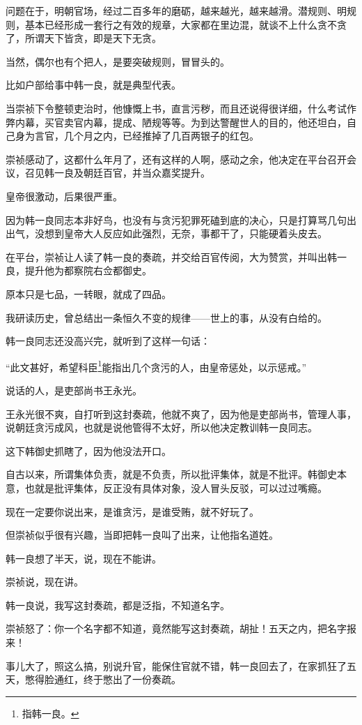 \begin{multicols}{\theparacolNo}
问题在于，明朝官场，经过二百多年的磨砺，越来越光，越来越滑。潜规则、明规则，基本已经形成一套行之有效的规章，大家都在里边混，就谈不上什么贪不贪了，所谓天下皆贪，即是天下无贪。

当然，偶尔也有个把人，是要突破规则，冒冒头的。

比如户部给事中韩一良，就是典型代表。

当崇祯下令整顿吏治时，他慷慨上书，直言污秽，而且还说得很详细，什么考试作弊内幕，买官卖官内幕，提成、陋规等等。为到达警醒世人的目的，他还坦白，自己身为言官，几个月之内，已经推掉了几百两银子的红包。

崇祯感动了，这都什么年月了，还有这样的人啊，感动之余，他决定在平台召开会议，召见韩一良及朝廷百官，并当众嘉奖提升。

皇帝很激动，后果很严重。

因为韩一良同志本非好鸟，也没有与贪污犯罪死磕到底的决心，只是打算骂几句出出气，没想到皇帝大人反应如此强烈，无奈，事都干了，只能硬着头皮去。

在平台，崇祯让人读了韩一良的奏疏，并交给百官传阅，大为赞赏，并叫出韩一良，提升他为都察院右佥都御史。

原本只是七品，一转眼，就成了四品。

我研读历史，曾总结出一条恒久不变的规律——世上的事，从没有白给的。

韩一良同志还没高兴完，就听到了这样一句话：

“此文甚好，希望科臣\footnote{指韩一良。}能指出几个贪污的人，由皇帝惩处，以示惩戒。”

说话的人，是吏部尚书王永光。

王永光很不爽，自打听到这封奏疏，他就不爽了，因为他是吏部尚书，管理人事，说朝廷贪污成风，也就是说他管得不太好，所以他决定教训韩一良同志。

这下韩御史抓瞎了，因为他没法开口。

自古以来，所谓集体负责，就是不负责，所以批评集体，就是不批评。韩御史本意，也就是批评集体，反正没有具体对象，没人冒头反驳，可以过过嘴瘾。

现在一定要你说出来，是谁贪污，是谁受贿，就不好玩了。

但崇祯似乎很有兴趣，当即把韩一良叫了出来，让他指名道姓。

韩一良想了半天，说，现在不能讲。

崇祯说，现在讲。

韩一良说，我写这封奏疏，都是泛指，不知道名字。

崇祯怒了：你一个名字都不知道，竟然能写这封奏疏，胡扯！五天之内，把名字报来！

事儿大了，照这么搞，别说升官，能保住官就不错，韩一良回去了，在家抓狂了五天，憋得脸通红，终于憋出了一份奏疏。


\end{multicols}
